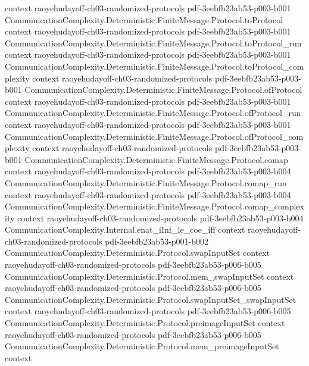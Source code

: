 \begin{theorem}
  {context}
  {raoyehudayoff-ch03-randomized-protocols}
  {pdf-3eebfb23ab53-p003-b001}
\proofstep
  {CommunicationComplexity.Deterministic.FiniteMessage.Protocol.toProtocol}
  {context}
  {raoyehudayoff-ch03-randomized-protocols}
  {pdf-3eebfb23ab53-p003-b001}
\proofstep
  {CommunicationComplexity.Deterministic.FiniteMessage.Protocol.toProtocol_run}
  {context}
  {raoyehudayoff-ch03-randomized-protocols}
  {pdf-3eebfb23ab53-p003-b001}
\proofstep
  {CommunicationComplexity.Deterministic.FiniteMessage.Protocol.toProtocol_complexity}
  {context}
  {raoyehudayoff-ch03-randomized-protocols}
  {pdf-3eebfb23ab53-p003-b001}
\proofstep
  {CommunicationComplexity.Deterministic.FiniteMessage.Protocol.ofProtocol}
  {context}
  {raoyehudayoff-ch03-randomized-protocols}
  {pdf-3eebfb23ab53-p003-b001}
\proofstep
  {CommunicationComplexity.Deterministic.FiniteMessage.Protocol.ofProtocol_run}
  {context}
  {raoyehudayoff-ch03-randomized-protocols}
  {pdf-3eebfb23ab53-p003-b001}
\proofstep
  {CommunicationComplexity.Deterministic.FiniteMessage.Protocol.ofProtocol_complexity}
  {context}
  {raoyehudayoff-ch03-randomized-protocols}
  {pdf-3eebfb23ab53-p003-b001}
\proofstep
  {CommunicationComplexity.Deterministic.FiniteMessage.Protocol.comap}
  {context}
  {raoyehudayoff-ch03-randomized-protocols}
  {pdf-3eebfb23ab53-p003-b004}
\proofstep
  {CommunicationComplexity.Deterministic.FiniteMessage.Protocol.comap_run}
  {context}
  {raoyehudayoff-ch03-randomized-protocols}
  {pdf-3eebfb23ab53-p003-b004}
\proofstep
  {CommunicationComplexity.Deterministic.FiniteMessage.Protocol.comap_complexity}
  {context}
  {raoyehudayoff-ch03-randomized-protocols}
  {pdf-3eebfb23ab53-p003-b004}
\proofstep
  {CommunicationComplexity.Internal.enat_iInf_le_coe_iff}
  {context}
  {raoyehudayoff-ch03-randomized-protocols}
  {pdf-3eebfb23ab53-p001-b002}
\proofstep
  {CommunicationComplexity.Deterministic.Protocol.swapInputSet}
  {context}
  {raoyehudayoff-ch03-randomized-protocols}
  {pdf-3eebfb23ab53-p006-b005}
\proofstep
  {CommunicationComplexity.Deterministic.Protocol.mem_swapInputSet}
  {context}
  {raoyehudayoff-ch03-randomized-protocols}
  {pdf-3eebfb23ab53-p006-b005}
\proofstep
  {CommunicationComplexity.Deterministic.Protocol.swapInputSet_swapInputSet}
  {context}
  {raoyehudayoff-ch03-randomized-protocols}
  {pdf-3eebfb23ab53-p006-b005}
\proofstep
  {CommunicationComplexity.Deterministic.Protocol.preimageInputSet}
  {context}
  {raoyehudayoff-ch03-randomized-protocols}
  {pdf-3eebfb23ab53-p006-b005}
\proofstep
  {CommunicationComplexity.Deterministic.Protocol.mem_preimageInputSet}
  {context}

\end{theorem}
